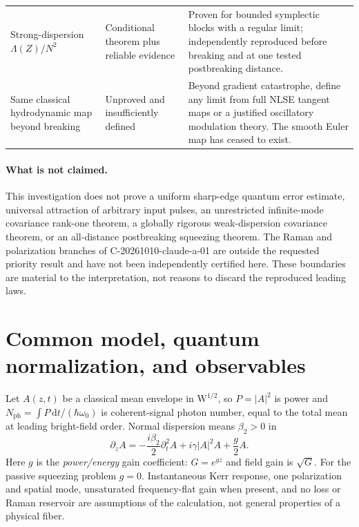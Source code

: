 \documentclass[11pt,a4paper]{article}
\newcommand{\dd}{\mathrm d}
\newcommand{\Nph}{N_{\mathrm{ph}}}
\begin{document}
\begin{longtable}{@{}p{}p{}p{}@{}}
Strong-dispersion $\Lambda(Z)/N^2$ & Conditional theorem plus reliable evidence & Proven for bounded symplectic blocks with a regular limit; independently reproduced before breaking and at one tested postbreaking distance. \\
Same classical hydrodynamic map beyond breaking & Unproved and insufficiently defined & Beyond gradient catastrophe, define any limit from full NLSE tangent maps or a justified oscillatory modulation theory. The smooth Euler map has ceased to exist. \\
\bottomrule
\end{longtable}

\paragraph{What is not claimed.} This investigation does not prove a uniform sharp-edge quantum error estimate, universal attraction of arbitrary input pulses, an unrestricted infinite-mode covariance rank-one theorem, a globally rigorous weak-dispersion covariance theorem, or an all-distance postbreaking squeezing theorem. The Raman and polarization branches of C-20261010-claude-a-01 are outside the requested priority result and have not been independently certified here. These boundaries are material to the interpretation, not reasons to discard the reproduced leading laws.

\section{Common model, quantum normalization, and observables}

Let $A(z,t)$ be a classical mean envelope in $\mathrm W^{1/2}$, so $P=|A|^2$ is power and $\Nph=\int P\,\dd t/(\hbar\omega_0)$ is coherent-signal photon number, equal to the total mean at leading bright-field order. Normal dispersion means $\beta_2>0$ in
\begin{equation}\label{eq:mean}
\partial_z A=-\frac{i\beta_2}{2}\partial_t^2 A+i\gamma |A|^2A+\frac g2 A.
\end{equation}
Here $g$ is the \emph{power/energy} gain coefficient: $G=e^{gz}$ and field gain is $\sqrt G$. For the passive squeezing problem $g=0$. Instantaneous Kerr response, one polarization and spatial mode, unsaturated frequency-flat gain when present, and no loss or Raman reservoir are assumptions of the calculation, not general properties of a physical fiber.
\end{document}
